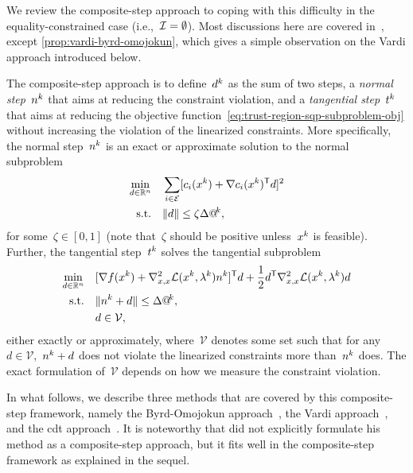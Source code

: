 We review the composite-step approach to coping with this difficulty in the equality-constrained case (i.e.,~$\mathcal{I} = \emptyset$).
Most discussions here are covered in~\cite[\S~15.4]{Conn_Gould_Toint_2000}, except \cref{prop:vardi-byrd-omojokun}, which gives a simple observation on the Vardi approach introduced below.

The composite-step approach is to define~$\step[k]$ as the sum of two steps, a \emph{normal step}~$\nstep[k]$ that aims at reducing the constraint violation, and a \emph{tangential step}~$\tstep[k]$ that aims at reducing the objective function~\cref{eq:trust-region-sqp-subproblem-obj} without increasing the violation of the linearized constraints.
More specifically, the normal step~$\nstep[k]$ is an exact or approximate solution to the normal subproblem
\begin{subequations}
    \label{eq:byrd-omojokun-original}
    \begin{align}
        \min_{\step \in \R^n}   & \quad \sum_{i \in \ieq} [\con{i}(\iter[k]) + \nabla \con{i}(\iter[k])^{\T} \step]^2 \label{eq:byrd-omojokun-original-obj}\\
        \text{s.t.}             & \quad \norm{\step} \le \zeta \rad[k],
    \end{align}
\end{subequations}
for some~$\zeta \in [0, 1]$ (note that~$\zeta$ should be positive unless~$\iter[k]$ is feasible).
Further, the tangential step~$\tstep[k]$ solves the tangential subproblem
\begin{subequations}
    \label{eq:tangential-step-original}
    \begin{align}
        \min_{\step \in \R^n}   & \quad [\nabla \obj(\iter[k]) + \nabla_{x, x}^2 \lag(\iter[k], \lm[k]) \nstep[k]]^{\T} \step + \frac{1}{2} \step^{\T} \nabla_{x, x}^2 \lag(\iter[k], \lm[k]) \step\\
        \text{s.t.}             & \quad \norm{\nstep[k] + \step} \le \rad[k],\\
                                & \quad \step \in \mathcal{V},
    \end{align}
\end{subequations}
either exactly or approximately, where~$\mathcal{V}$ denotes some set such that for any~$d \in \mathcal{V}$,~$\nstep[k] + \step$ does not violate the linearized constraints more than~$\nstep[k]$ does.
The exact formulation of~$\mathcal{V}$ depends on how we measure the constraint violation.

In what follows, we describe three methods that are covered by this composite-step framework, namely the Byrd-Omojokun approach~\cite{Byrd_1987,Omojokun_1989}, the Vardi approach~\cite{Vardi_1985}, and the \gls{cdt} approach~\cite{Celis_Dennis_Tapia_1985}.
It is noteworthy that \citeauthor{Vardi_1985} did not explicitly formulate his method as a composite-step approach, but it fits well in the composite-step framework as explained in the sequel.

